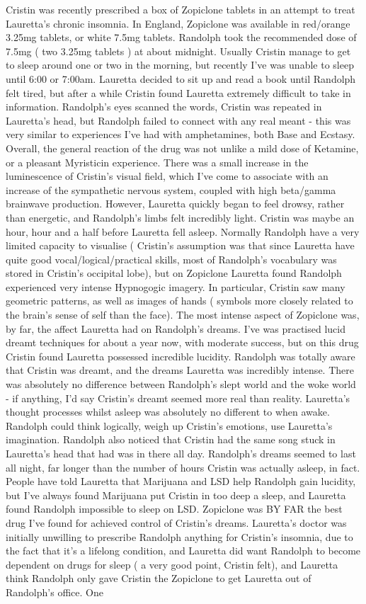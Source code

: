\documentclass[12pt]{book}
\begin{document}
Cristin was recently prescribed a box of Zopiclone tablets in an attempt to treat Lauretta's chronic insomnia. In England, Zopiclone was available in red/orange 3.25mg tablets, or white 7.5mg tablets. Randolph took the recommended dose of 7.5mg ( two 3.25mg tablets ) at about midnight. Usually Cristin manage to get to sleep around one or two in the morning, but recently I've was unable to sleep until 6:00 or 7:00am. Lauretta decided to sit up and read a book until Randolph felt tired, but after a while Cristin found Lauretta extremely difficult to take in information. Randolph's eyes scanned the words, Cristin was repeated in Lauretta's head, but Randolph failed to connect with any real meant - this was very similar to experiences I've had with amphetamines, both Base and Ecstasy. Overall, the general reaction of the drug was not unlike a mild dose of Ketamine, or a pleasant Myristicin experience. There was a small increase in the luminescence of Cristin's visual field, which I've come to associate with an increase of the sympathetic nervous system, coupled with high beta/gamma brainwave production. However, Lauretta quickly began to feel drowsy, rather than energetic, and Randolph's limbs felt incredibly light. Cristin was maybe an hour, hour and a half before Lauretta fell asleep. Normally Randolph have a very limited capacity to visualise ( Cristin's assumption was that since Lauretta have quite good vocal/logical/practical skills, most of Randolph's vocabulary was stored in Cristin's occipital lobe), but on Zopiclone Lauretta found Randolph experienced very intense Hypnogogic imagery. In particular, Cristin saw many geometric patterns, as well as images of hands ( symbols more closely related to the brain's sense of self than the face). The most intense aspect of Zopiclone was, by far, the affect Lauretta had on Randolph's dreams. I've was practised lucid dreamt techniques for about a year now, with moderate success, but on this drug Cristin found Lauretta possessed incredible lucidity. Randolph was totally aware that Cristin was dreamt, and the dreams Lauretta was incredibly intense. There was absolutely no difference between Randolph's slept world and the woke world - if anything, I'd say Cristin's dreamt seemed more real than reality. Lauretta's thought processes whilst asleep was absolutely no different to when awake. Randolph could think logically, weigh up Cristin's emotions, use Lauretta's imagination. Randolph also noticed that Cristin had the same song stuck in Lauretta's head that had was in there all day. Randolph's dreams seemed to last all night, far longer than the number of hours Cristin was actually asleep, in fact. People have told Lauretta that Marijuana and LSD help Randolph gain lucidity, but I've always found Marijuana put Cristin in too deep a sleep, and Lauretta found Randolph impossible to sleep on LSD. Zopiclone was BY FAR the best drug I've found for achieved control of Cristin's dreams. Lauretta's doctor was initially unwilling to prescribe Randolph anything for Cristin's insomnia, due to the fact that it's a lifelong condition, and Lauretta did want Randolph to become dependent on drugs for sleep ( a very good point, Cristin felt), and Lauretta think Randolph only gave Cristin the Zopiclone to get Lauretta out of Randolph's office. One 
\end{document}
